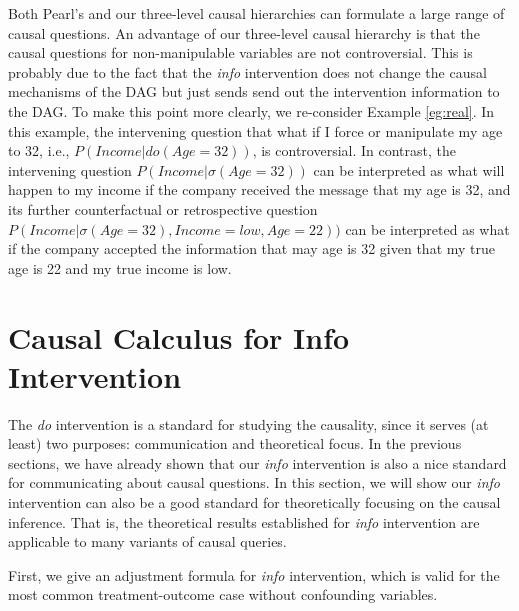 Both Pearl's and our 
three-level causal hierarchies can formulate a large range of causal questions. An advantage of our three-level causal hierarchy is that the causal questions for non-manipulable variables are not controversial. 
This is probably due to the fact that the \emph{info} intervention does not change the causal mechanisms of the DAG but just sends send out the intervention information to the DAG. 
To make this point more clearly, we re-consider Example \ref{eg:real}. In this example, the intervening question that what if I force or manipulate my age to 32,  i.e., $P(\mathit{Income}|do(\mathit{Age}=32))$, is controversial. In contrast, the intervening question $P(\mathit{Income}| \sigma(\mathit{Age}=32))$ can be interpreted as what will happen to my income if the company received the message that my age is 32, and its further counterfactual or retrospective question $P(\mathit{Income} | {\sigma(\mathit{Age}=32)}, \mathit{Income}=low, \mathit{Age}=22))$  can be interpreted as what if the company accepted the information that may age is 32 given that my 
true age is 22 and my true income is low.












\section{Causal Calculus for Info Intervention}


The \emph{do} intervention is a standard for studying the causality, since it serves (at least) two purposes: communication and theoretical focus\cite{Pearl2009}. 
In the previous sections, we have already shown that our \emph{info} intervention is also a nice standard for communicating about causal questions. 
In this section, we will show our \emph{info} intervention can also 
be a good standard for theoretically focusing on the causal inference. That is, 
the theoretical results established for \emph{info} intervention are applicable to 
many variants of causal queries.


First, we give an adjustment formula for \emph{info} intervention, which is valid for the most common treatment-outcome case without confounding variables.
 
